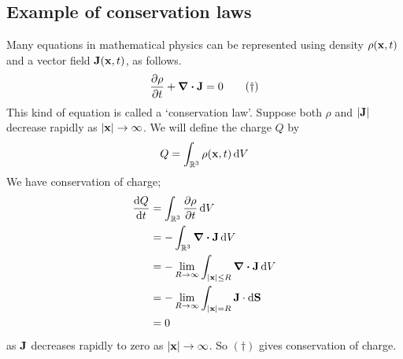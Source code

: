 \subsection{Example of conservation laws}
Many equations in mathematical physics can be represented using density \(\rho(\vb x, t)\) and a vector field \(\vb J(\vb x, t)\), as follows.
\begin{equation}
	\pdv{\rho}{t} + \div{\vb J} = 0 \tag{\(\dagger\)}
\end{equation}
This kind of equation is called a `conservation law'.
Suppose both \(\rho\) and \(\abs{\vb J}\) decrease rapidly as \(\abs{\vb x} \to \infty\).
We will define the charge \(Q\) by
\[
	Q = \int_{\mathbb R^3} \rho(\vb x, t) \dd{V}
\]
We have conservation of charge;
\begin{align*}
	\dv{Q}{t} & = \int_{\mathbb R^3} \pdv{\rho}{t} \dd{V}                            \\
	          & = -\int_{\mathbb R^3} \div{\vb J} \dd{V}                             \\
	          & = -\lim_{R \to \infty} \int_{\abs{\vb x} \leq R} \div{\vb J} \dd{V}  \\
	          & = -\lim_{R \to \infty} \int_{\abs{\vb x} = R} \vb J \cdot \dd{\vb S} \\
	          & = 0                                                                  \\
\end{align*}
as \(\vb J\) decreases rapidly to zero as \(\abs{\vb x} \to \infty\).
So \((\dagger)\) gives conservation of charge.
